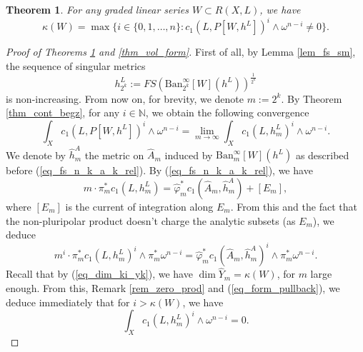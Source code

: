 \documentclass[10pt,a4paper]{amsart}
\newtheorem{thm}{Theorem}
\newcommand{\nat}{\mathbb{N}}
\begin{document}
	\begin{thm}\label{thm_ki_form}
		For any graded linear series $W \subset R(X, L)$, we have
		\begin{equation}\label{eq_kappa_w}	
			\kappa(W) = \max\Big\{
				i \in \{ 0, 1, \ldots, n \} :  c_1(L, P[W, h^L])^{i} \wedge \omega^{n - i} \neq 0
			\Big\}.
		\end{equation}
	\end{thm}

	\begin{proof}[Proof of Theorems \ref{thm_ki_form} and \ref{thm_vol_form}]
		First of all, by Lemma \ref{lem_fs_sm}, the sequence of singular metrics
		\begin{equation}
			h^L_{2^k}
			:=
			FS({\textrm{Ban}}_{2^k}^{\infty}[W](h^L))^{\frac{1}{2^k}}
		\end{equation}
		is non-increasing.
		From now on, for brevity, we denote $m := 2^k$.
		By Theorem \ref{thm_cont_begz}, for any $i \in \nat$, we obtain the following convergence
		\begin{equation}
			\int_X c_1(L, P[W, h^L])^{i} \wedge \omega^{n - i}
			=
			\lim_{m \to \infty} \int_X c_1(L, h^L_m)^{i} \wedge \omega^{n - i}.
		\end{equation}
		We denote by $\widehat{h}^A_m$ the metric on $\widehat{A}_{m}$ induced by ${\textrm{Ban}}_{m}^{\infty}[W](h^L)$ as described before (\ref{eq_fs_n_k_a_k_rel}).
		By (\ref{eq_fs_n_k_a_k_rel}), we have
		\begin{equation}
			m \cdot \pi_m^* c_1(L, h^L_m)
			=
			\widehat{\varphi}_{m}^* c_1(\widehat{A}_{m}, \widehat{h}^A_m)
			+
			[E_m],
		\end{equation}
		where $[E_m]$ is the current of integration along $E_m$.
		From this and the fact that the non-pluripolar product doesn't charge the analytic subsets (as $E_m$), we deduce 
		\begin{equation}\label{eq_form_pullback}
			m^i \cdot \pi_m^* c_1(L, h^L_m)^{i} \wedge \pi_m^* \omega^{n - i}
			=
			\widehat{\varphi}_m^* c_1(\widehat{A}_m, \widehat{h}^A_m)^{i} \wedge \pi_m^* \omega^{n - i}.
		\end{equation}
		Recall that by (\ref{eq_dim_ki_yk}), we have $\dim \widehat{Y}_m = \kappa(W)$, for $m$ large enough.
		From this, Remark \ref{rem_zero_prod} and (\ref{eq_form_pullback}), we deduce immediately that for $i > \kappa(W)$, we have
		\begin{equation}\label{eq_i_big_zero}
			\int_X c_1(L, h^L_m)^{i} \wedge \omega^{n - i}
			=
			0.
		\end{equation}

\end{proof}
\end{document}
